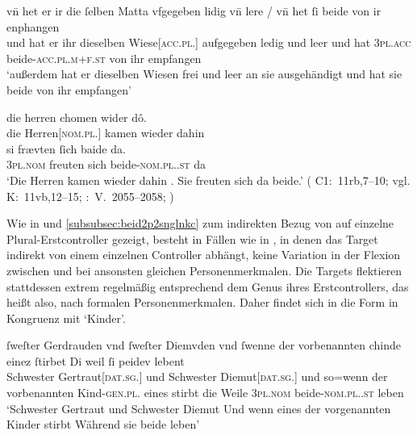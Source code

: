 \begin{exe}
\ex \label{ex:pronindir}
	\begin{xlist}
	\ex \label{ex:pronindir_1}
		\gll vn̄ het er ir {die ſelben} Matta vfgegeben lidig vn̄ lere /
			vn̄ het ſi beide von ir enphangen \\
		und hat er ihr dieselben Wiese[\textsc{acc.pl.\FemI}] aufgegeben ledig
			und leer {} und hat \textsc{3pl\subI.acc}
			beide-\textsc{acc.pl.m+f\subI.st} von ihr empfangen \\
		\trans `außerdem hat er dieselben Wiesen frei und leer an sie
			ausgehändigt und hat sie beide von ihr 
			empfangen'
			\parencites(Nr.~2733, Freiburg i.\,Br., 1297)[105,23--24]{cao4}

	\ex \label{ex:pronindir_2}
		\gll die herren chomen wider dô. \\
			die Herren[\textsc{nom.pl.\MascM}] kamen wieder dahin \\
			\textelp{}
	\sn \gll si frævten ſich baide da. \\
			\textsc{3pl\subM.nom} freuten sich beide-\textsc{nom.pl.\MascM.st}
			da \\
		\trans `Die Herren kamen wieder dahin \textelp{}. Sie freuten sich da
			beide.'
			(%
				C1:~11rb,7--10; vgl.
				K:~11vb,12--15;
				\KC:~V.~2055--2058;
				\cite[119]{schroeder1895}%
			)
	\end{xlist}
\end{exe}

Wie in  und \ref{subsubsec:beid2p2snglnkc}
zum indirekten Bezug von  auf einzelne Plural-Erstcontroller
gezeigt, besteht in Fällen wie in , in denen das Target
indirekt von einem einzelnen Controller abhängt, keine Variation in der Flexion
zwischen  und  bei ansonsten gleichen
Personenmerkmalen. Die Targets flektieren stattdessen extrem regelmäßig
entsprechend dem Genus ihres Erstcontrollers, das heißt also, nach formalen
Personenmerkmalen. Daher findet sich in  die Form
 in Kongruenz mit  `Kinder'.

\begin{exe}
\ex \label{ex:f+f_kindesibeidiu}
	\gll ſweſter Gerdrauden vnd ſweſter Diemvden
			\textelp{} vnd ſwenne der vorbenannten chinde einez ſtirbet
			\textelp{} Di weil ſi peidev lebent \\
		Schwester Gertraut[\textsc{dat.sg.\FemF}] und Schwester
			Diemut[\textsc{dat.sg.\FemF}]
			{} und so=wenn der vorbenannten
			Kind-\textsc{gen.pl.\NeutF} eines stirbt {} die Weile
			\textsc{3pl\subF.nom} beide-\textsc{nom.pl.\NeutF.st} leben \\
	\trans `Schwester Gertraut und Schwester Diemut
		\textelp{} Und wenn eines der vorgenannten Kinder stirbt \textelp{}
		Während sie beide leben'
		\parencites(Nr.~2960, Engelthal, Kr.~Nürnberger Land, 1298)[240,31--38]{cao4}
\end{exe}

